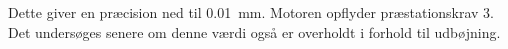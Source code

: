 Dette giver en præcision ned til \SI{0,01}{mm}. Motoren opflyder præstationskrav 3. Det undersøges senere om denne værdi også er overholdt i forhold til udbøjning.

